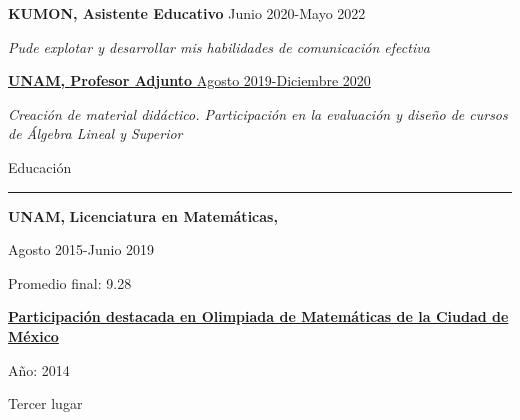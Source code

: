 \documentclass{article}
\begin{document}
\begin{minipage}[t]{0.60\textwidth}
{\large \textbf{KUMON, Asistente Educativo}}
{\small Junio 2020-Mayo 2022}


{\small \textit{Pude explotar y desarrollar mis habilidades de comunicación efectiva}}

\hypersetup{
    urlcolor=black,
    linkcolor=blue
}

\href{https://archive.fciencias.unam.mx/directorio/86068}{{\large \textbf{UNAM, Profesor Adjunto}}
{\small Agosto 2019-Diciembre 2020}}

{\small \textit{Creación de material didáctico. Participación en la evaluación y diseño de cursos de Álgebra Lineal y Superior}}


\vspace{0.4cm}


{\large Educación}
\rule{\linewidth}{0.4pt}

\vspace{0.2cm}



\large \textbf{UNAM, }
\large \textbf{Licenciatura en Matemáticas,}

{\small Agosto 2015-Junio 2019}

{\small Promedio final: 9.28}

\vspace{0.2cm}


\href{https://www.sinembargo.mx/10-05-2014/988569}{\large \textbf{Participación destacada en Olimpiada de Matemáticas de la Ciudad de México}}

{\small Año: 2014}

{\small Tercer lugar}



\end{minipage}


\clearpage

\end{document}
